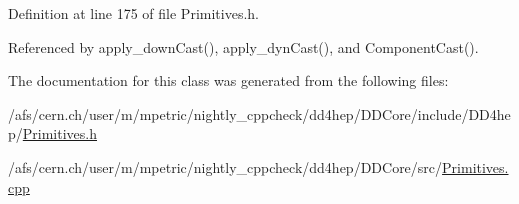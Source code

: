 Definition at line 175 of file Primitives.h.

Referenced by apply\_\-downCast(), apply\_\-dynCast(), and ComponentCast().

The documentation for this class was generated from the following files:\begin{DoxyCompactItemize}
\item 
/afs/cern.ch/user/m/mpetric/nightly\_\-cppcheck/dd4hep/DDCore/include/DD4hep/\hyperlink{_primitives_8h}{Primitives.h}\item 
/afs/cern.ch/user/m/mpetric/nightly\_\-cppcheck/dd4hep/DDCore/src/\hyperlink{_primitives_8cpp}{Primitives.cpp}\end{DoxyCompactItemize}
